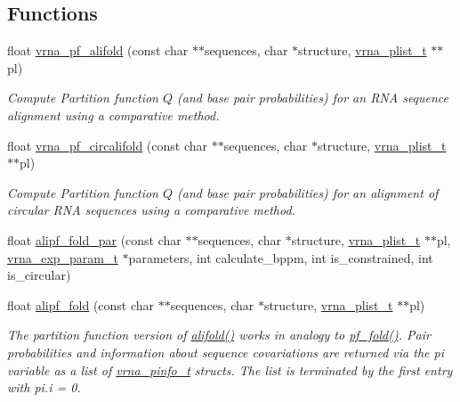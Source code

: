\subsection*{Functions}
\begin{DoxyCompactItemize}
\item 
float \hyperlink{group__consensus__pf__fold_ga87296fe8e93bb5261783a8db901a5c64}{vrna\+\_\+pf\+\_\+alifold} (const char $\ast$$\ast$sequences, char $\ast$structure, \hyperlink{group__data__structures_ga8e4eb5e1bfc95776559575beb359af87}{vrna\+\_\+plist\+\_\+t} $\ast$$\ast$pl)
\begin{DoxyCompactList}\small\item\em Compute Partition function $Q$ (and base pair probabilities) for an R\+NA sequence alignment using a comparative method. \end{DoxyCompactList}\item 
float \hyperlink{group__consensus__pf__fold_ga017209394a4c1e68d96cd47e61d16d25}{vrna\+\_\+pf\+\_\+circalifold} (const char $\ast$$\ast$sequences, char $\ast$structure, \hyperlink{group__data__structures_ga8e4eb5e1bfc95776559575beb359af87}{vrna\+\_\+plist\+\_\+t} $\ast$$\ast$pl)
\begin{DoxyCompactList}\small\item\em Compute Partition function $Q$ (and base pair probabilities) for an alignment of circular R\+NA sequences using a comparative method. \end{DoxyCompactList}\item 
float \hyperlink{group__consensus__pf__fold_ga5e8d54e41bf3d5b6e535d5bdb33c416e}{alipf\+\_\+fold\+\_\+par} (const char $\ast$$\ast$sequences, char $\ast$structure, \hyperlink{group__data__structures_ga8e4eb5e1bfc95776559575beb359af87}{vrna\+\_\+plist\+\_\+t} $\ast$$\ast$pl, \hyperlink{group__energy__parameters_ga01d8b92fe734df8d79a6169482c7d8d8}{vrna\+\_\+exp\+\_\+param\+\_\+t} $\ast$parameters, int calculate\+\_\+bppm, int is\+\_\+constrained, int is\+\_\+circular)
\item 
float \hyperlink{group__consensus__pf__fold_gaa150d3ba7b009a1c27cb6f0eb197f6b4}{alipf\+\_\+fold} (const char $\ast$$\ast$sequences, char $\ast$structure, \hyperlink{group__data__structures_ga8e4eb5e1bfc95776559575beb359af87}{vrna\+\_\+plist\+\_\+t} $\ast$$\ast$pl)
\begin{DoxyCompactList}\small\item\em The partition function version of \hyperlink{group__consensus__mfe__fold_ga4cf00f0659e5f0480335d69e797f05b1}{alifold()} works in analogy to \hyperlink{group__pf__fold_gadc3db3d98742427e7001a7fd36ef28c2}{pf\+\_\+fold()}. Pair probabilities and information about sequence covariations are returned via the \textquotesingle{}pi\textquotesingle{} variable as a list of \hyperlink{group__aln__utils_ga6660dfca23debee7306e0cd53341263f}{vrna\+\_\+pinfo\+\_\+t} structs. The list is terminated by the first entry with pi.\+i = 0. \end{DoxyCompactList}\item 

\end{DoxyCompactItemize}

